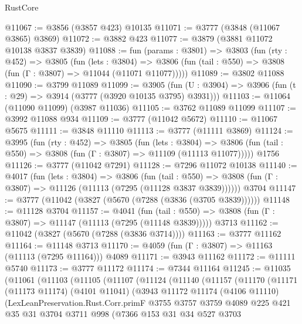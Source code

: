 \begin{lexlean}{RustCore}
\begin{coremodule}
@11067 := @3856 (@3857 @423) @10135
@11071 := @3777 (@3848 (@11067 @3865) @3869)
@11072 := @3882 @423
@11077 := @3879 (@3881 @11072 @10138 @3837 @3839)
@11088 := fun (params : @3801) =>
  @3803
    (fun (rty : @452) =>
    @3805
      (fun (lets : @3804) =>
      @3806 (fun (tail : @550) => @3808 (fun (Γ : @3807) => @11044 (@11071 @11077)))))
@11089 := @3802 @11088
@11090 := @3799 @11089
@11099 := @3905
    (fun (U : @3904) => @3906 (fun (t : @29) => @3914 (@3777 (@3920 @10135 @3795) @3931)))
@11103 := @11064 (@11090 @11099) (@3987 @11036)
@11105 := @3762 @11089 @11099
@11107 := @3992 @11088 @934
@11109 := @3777 (@11042 @5672)
@11110 := @11067 @5675
@11111 := @3848 @11110
@11113 := @3777 (@11111 @3869)
@11124 := @3995
    (fun (rty : @452) =>
    @3805
      (fun (lets : @3804) =>
      @3806 (fun (tail : @550) => @3808 (fun (Γ : @3807) => @11109 (@11113 @11077)))))
    @1756
@11126 := @3777 (@11042 @7291)
@11128 := @7296 @11072 @10138
@11140 := @4017
    (fun (lets : @3804) =>
    @3806
      (fun (tail : @550) =>
      @3808 (fun (Γ : @3807) => @11126 (@11113 (@7295 (@11128 @3837 @3839))))))
    @3704
@11147 := @3777 (@11042 (@3827 (@5670 (@7288 (@3836 (@3705 @3839))))))
@11148 := @11128 @3704
@11157 := @4041
    (fun (tail : @550) => @3808 (fun (Γ : @3807) => @11147 (@11113 (@7295 (@11148 @3839)))))
    @3713
@11162 := @11042 (@3827 (@5670 (@7288 (@3836 @3714))))
@11163 := @3777 @11162
@11164 := @11148 @3713
@11170 := @4059 (fun (Γ : @3807) => @11163 (@11113 (@7295 @11164))) @4089
@11171 := @3943 @11162
@11172 := @11111 @5740
@11173 := @3777 @11172
@11174 := @7344 @11164
@11245 := @11035
    (@11061
      (@11103
        (@11105
          (@11107
            (@11124
              (@11140
                (@11157
                  (@11170
                    (@11171
                      (@11173 @11174)
                      (@4101 @11041)
                      (@3943
                        @11172
                        @11174
                        (@4106 @11110)
                        (LexLeanPreservation.Rust.Corr.primF
                          @3755
                          @3757
                          @3759
                          @4089
                          @225
                          @421
                          @35
                          @31
                          @3704
                          @3711
                          @998
                          (@7366
                            @153
                            @31
                            @34
                            @527
                            @3703

\end{coremodule}
\end{lexlean}
